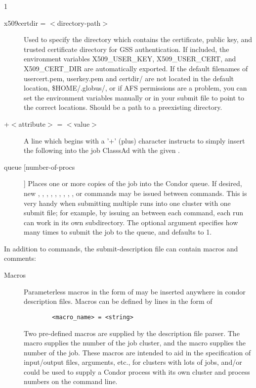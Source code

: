 \begin{ManPage}{\label{man-condor-submit}}{1}
\begin{description}

\item[x509certdir = $<$directory-path$>$] Used to specify the directory 
which contains the certificate, public key, and trusted certificate directory
for GSS authentication. If included, the environment variables X509\_USER\_KEY,
X509\_USER\_CERT, and X509\_CERT\_DIR are automatically exported. If the default
filenames of usercert.pem, userkey.pem and certdir/ are not located in the 
default location, \$HOME/.globus/, or if AFS permissions are a problem, you
can set the environment variables manually or in your submit file to point
to the correct locations. Should be a path to a preexisting directory.  


\item[+$<$attribute$>$ = $<$value$>$] A line which begins with a '+'
(plus) character instructs  to simply insert the
following  into the job ClasssAd with the given 
. 


\item[queue [number-of-procs] ] Places one or more copies of the job into
the Condor queue. If desired, new , ,
, , , ,
, , , or 
commands may be issued between  commands. This is very handy
when submitting multiple runs into one cluster with one submit file; for
example, by issuing an  between each 
command, each run can work in its own subdirectory. The optional
argument  specifies how many times to submit the
job to the queue, and defaults to 1.

\end{description}

In addition to commands, the submit-description file can contain macros
and comments:

\begin{description}

\item[Macros] Parameterless macros in the form of 
may be inserted anywhere in condor description files. Macros can be
defined by lines in the form of 
\begin{verbatim} 
        <macro_name> = <string> 
\end{verbatim} 
Two pre-defined macros are supplied by the description file parser. The
 macro supplies the number of the job cluster, and the
 macro supplies the number of the job. These macros are
intended to aid in the specification of input/output files, arguments,
etc., for clusters with lots of jobs, and/or could be used to supply a
Condor process with its own cluster and process numbers on the command
line. 


\end{description}
\end{ManPage}
